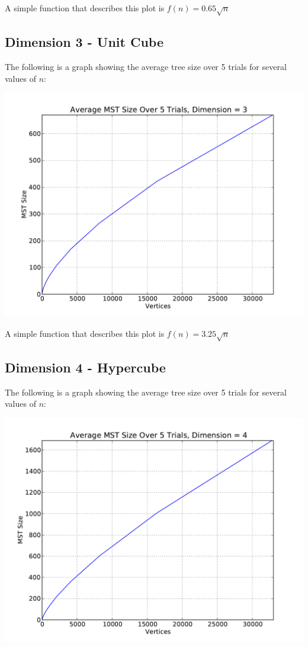 \documentclass[solution, letterpaper]{cs121}
\begin{document}
A simple function that describes this plot is $f(n) = 0.65 \sqrt{n}$
\pagebreak
\subsection*{Dimension 3 - Unit Cube}

The following is a graph showing the average tree size over 5 trials for several values of $n$:
\begin{center}
\includegraphics[scale=0.8]{kruskals-dimension-3.pdf}
\end{center}

A simple function that describes this plot is $f(n) = 3.25 \sqrt{n}$
\pagebreak
\subsection*{Dimension 4 - Hypercube}

The following is a graph showing the average tree size over 5 trials for several values of $n$:
\begin{center}
\includegraphics[scale=0.8]{kruskals-dimension-4.pdf}
\end{center}
\end{document}
